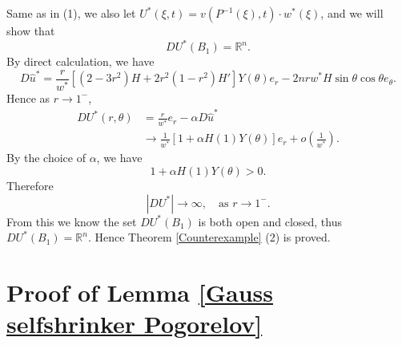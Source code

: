 \documentclass[reqno]{amsart}
\theoremstyle{remark}
\theoremstyle{definition}
\numberwithin{equation}{section}
\begin{document}
Same as in (1), we also let \(U^*(\xi, t) = v(P^{-1}(\xi), t)\cdot w^*(\xi)\), and we will show that 
\[
D U^*(B_1) = \mathbb{R}^n.
\]
By direct calculation, we have
\[
D \hat{u}^*=\frac{r}{w^*}\left[(2-3r^2)H+2r^2(1-r^2)H'\right]Y(\theta)e_r-2nrw^*H\sin\theta\cos\theta e_\theta.
\]
Hence as $r \to 1^-$, 
\begin{align*}
    D U^*(r, \theta) &= \frac{r}{w^*}e_r - \alpha D \hat{u}^* \\
    &\to \frac{1}{w^*}\left[1 + \alpha H(1)Y(\theta) \right] e_r + o(\frac{1}{w^*}).
\end{align*}
By the choice of $\alpha$, we have
\[
1 + \alpha H(1)Y(\theta) > 0.
\]
Therefore
\[
\left| D U^* \right| \to \infty, \quad \text{as } r \to 1^-.
\]
From this we know the set $D U^*(B_1)$ is both open and closed, thus $D U^*(B_1) = \mathbb{R}^n$. Hence Theorem \ref{Counterexample} (2) is proved.



\appendix

\section{Proof of Lemma \ref{Gauss selfshrinker Pogorelov}}\label{Proof of Gauss selfshrinker Pogorelov}
\end{document}
